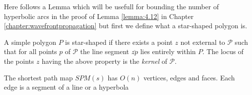 Here follows a Lemma which will be usefull for bounding the number of hyperbolic arcs in the proof 
of Lemma \ref{lemma:4.12} in Chapter \ref{chapter:wavefrontpropagation} but first we define what
a star-shaped polygon is.

\begin{mydef}\cite{PreparataS85}
	\label{star-shaped}
	A simple polygon $P$ is star-shaped if there exists a point $z$ not external
	to $\mathcal{P}$ such that for all points $p$ of $\mathcal{P}$ the line segment 
	$\overline{zp}$ lies entirely within $P$. The locus of the points $z$ having the 
	above property is the \emph{kernel} of $\mathcal{P}$.
\end{mydef}

\begin{Lemma}[Lemma 3.2]
	\label{lemma:3.2}
	The shortest path map $SPM(s)$ has $O(n)$ vertices, edges and faces. Each
	edge is a segment of a line or a hyperbola
\end{Lemma}
